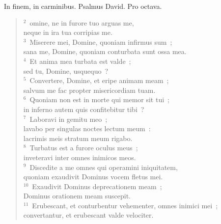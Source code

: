 \bchapter[Psalm]
In finem, in carminibus. Psalmus David. Pro octava.
\begin{verse}${}^{2}$~omine, ne in furore tuo arguas me,\\ neque in ira tua corripias me.\\
${}^{3}$~Miserere mei, Domine, quoniam infirmus sum~;\\ sana me, Domine, quoniam conturbata sunt ossa mea.\\
${}^{4}$~Et anima mea turbata est valde~;\\ sed tu, Domine, usquequo~?\\
${}^{5}$~Convertere, Domine, et eripe animam meam~;\\ salvum me fac propter misericordiam tuam.\\
${}^{6}$~Quoniam non est in morte qui memor sit tui~;\\ in inferno autem quis confitebitur tibi~?\\
${}^{7}$~Laboravi in gemitu meo~;\\ lavabo per singulas noctes lectum meum~:\\ lacrimis meis stratum meum rigabo.\\
${}^{8}$~Turbatus est a furore oculus meus~;\\ inveteravi inter omnes inimicos meos.\\
${}^{9}$~Discedite a me omnes qui operamini iniquitatem,\\ quoniam exaudivit Dominus vocem fletus mei.\\
${}^{10}$~Exaudivit Dominus deprecationem meam~;\\ Dominus orationem meam suscepit.\\
${}^{11}$~Erubescant, et conturbentur vehementer, omnes inimici mei~;\\ convertantur, et erubescant valde velociter.\end{verse}



